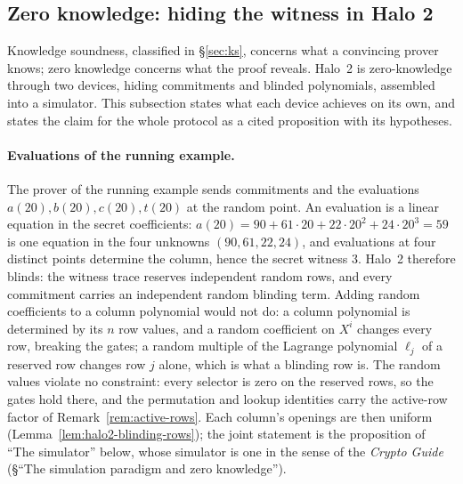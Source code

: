 \documentclass[11pt,a4paper]{article}
\theoremstyle{definition}
\begin{document}
\subsection{Zero knowledge: hiding the witness in Halo 2}
\label{sec:halo2-zk}

Knowledge soundness, classified in \S\ref{sec:ks}, concerns what a
convincing prover knows; zero knowledge concerns what the proof reveals.
Halo~2 is zero-knowledge through two devices, hiding commitments and
blinded polynomials, assembled into a simulator. This subsection states
what each device achieves on its own, and states the claim for the whole
protocol as a cited proposition with its hypotheses.

\paragraph{Evaluations of the running example.}
The prover of the running example sends commitments and the evaluations
$a(20),\allowbreak b(20),\allowbreak c(20),\allowbreak t(20)$ at the random
point. An evaluation is a
linear equation in the secret coefficients:
$a(20) = 90 + 61 \cdot 20 + 22 \cdot 20^2 + 24 \cdot 20^3 = 59$ is one
equation in the four unknowns $(90, 61, 22, 24)$, and evaluations at four
distinct points determine the column, hence the secret witness $3$. Halo~2
therefore blinds: the witness trace reserves independent random rows,
and every commitment carries an independent random blinding term. Adding
random coefficients to a column polynomial would not do: a column
polynomial is determined by its $n$ row values, and a random coefficient
on $X^{i}$ changes every row, breaking the gates; a random multiple of
the Lagrange polynomial $\ell_j$ of a reserved row changes row $j$ alone,
which is what a blinding row is. The random values violate no
constraint: every selector is zero on the reserved rows, so the gates
hold there, and the permutation and lookup identities carry the
active-row factor of Remark~\ref{rem:active-rows}. Each column's
openings are then uniform (Lemma~\ref{lem:halo2-blinding-rows}); the
joint statement is the
proposition of ``The simulator'' below, whose simulator is one in the
sense of the \emph{Crypto Guide} (\S``The simulation paradigm and zero
knowledge'').
\end{document}
